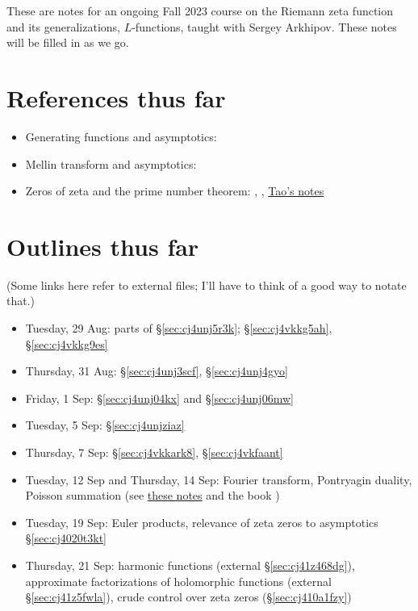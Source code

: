 \documentclass[reqno]{amsart}  \numberwithin{theorem}{section} \numberwithin{equation}{section}
\begin{document}
 
These are notes for an ongoing Fall 2023 course on the Riemann zeta function and its generalizations, $L$-functions, taught with Sergey Arkhipov.  These notes will be filled in as we go.

\section{References thus far}
\begin{itemize}
\item Generating functions and asymptotics: \cite[\S5.2]{MR2172781}
\item Mellin transform and asymptotics: \cite{zagier-mellin}
\item Zeros of zeta and the prime number theorem: \cite{Dav80}, \cite{MR2061214}, \href{https://terrytao.wordpress.com/2014/12/09/254a-notes-2-complex-analytic-multiplicative-number-theory/}{Tao's notes}
\end{itemize}

\section{Outlines thus far}
(Some links here refer to external files; I'll have to think of a good way to notate that.)
\begin{itemize}
\item Tuesday, 29 Aug: parts of \S\ref{sec:cj4unj5r3k}; \S\ref{sec:cj4vkkg5ah}, \S\ref{sec:cj4vkkg9es}
\item Thursday, 31 Aug: \S\ref{sec:cj4unj3scf}, \S\ref{sec:cj4unj4gyo}
\item Friday, 1 Sep: \S\ref{sec:cj4unj04kx} and \S\ref{sec:cj4unj06mw}
\item Tuesday, 5 Sep: \S\ref{sec:cj4unjziaz}
\item Thursday, 7 Sep: \S\ref{sec:cj4vkkark8}, \S\ref{sec:cj4vkfaant}
\item Tuesday, 12 Sep and Thursday, 14 Sep: Fourier transform, Pontryagin duality, Poisson summation (see \href{20230919T144827--discrete-fourier-transform.pdf}{these notes} and the book \cite{MR3289059})
\item Tuesday, 19 Sep: Euler products, relevance of zeta zeros to asymptotics \S\ref{sec:cj4020t3kt}
\item Thursday, 21 Sep: harmonic functions (external \S\ref{sec:cj41z468dg}), approximate factorizations of holomorphic functions (external \S\ref{sec:cj41z5fwla}), crude control over zeta zeros (\S\ref{sec:cj410a1fzy}) 
\end{itemize}
\end{document}
